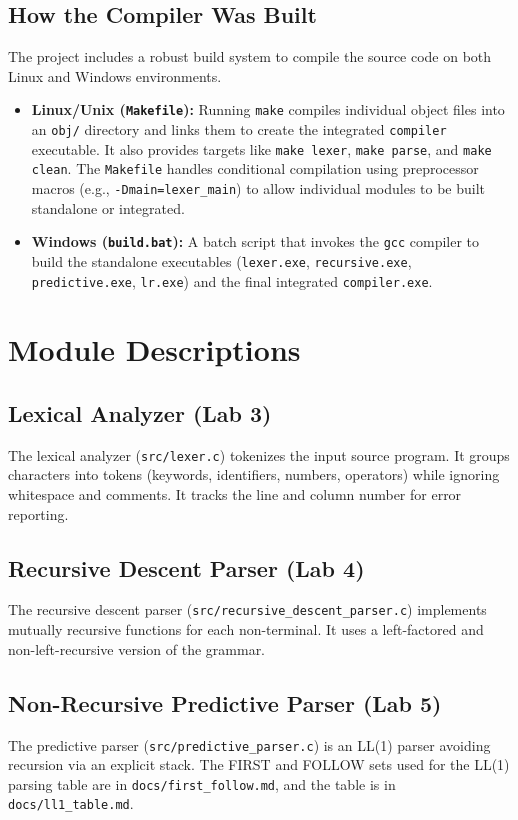 \documentclass[12pt,a4paper]{article}
\begin{document}
\subsection{How the Compiler Was Built}
The project includes a robust build system to compile the source code on both Linux and Windows environments.
\begin{itemize}
    \item \textbf{Linux/Unix (\texttt{Makefile}):} Running \texttt{make} compiles individual object files into an \texttt{obj/} directory and links them to create the integrated \texttt{compiler} executable. It also provides targets like \texttt{make lexer}, \texttt{make parse}, and \texttt{make clean}. The \texttt{Makefile} handles conditional compilation using preprocessor macros (e.g., \texttt{-Dmain=lexer\_main}) to allow individual modules to be built standalone or integrated.
    \item \textbf{Windows (\texttt{build.bat}):} A batch script that invokes the \texttt{gcc} compiler to build the standalone executables (\texttt{lexer.exe}, \texttt{recursive.exe}, \texttt{predictive.exe}, \texttt{lr.exe}) and the final integrated \texttt{compiler.exe}.
\end{itemize}

\section{Module Descriptions}

\subsection{Lexical Analyzer (Lab 3)}
The lexical analyzer (\texttt{src/lexer.c}) tokenizes the input source program. It groups characters into tokens (keywords, identifiers, numbers, operators) while ignoring whitespace and comments. It tracks the line and column number for error reporting.

\subsection{Recursive Descent Parser (Lab 4)}
The recursive descent parser (\texttt{src/recursive\_descent\_parser.c}) implements mutually recursive functions for each non-terminal. It uses a left-factored and non-left-recursive version of the grammar.

\subsection{Non-Recursive Predictive Parser (Lab 5)}
The predictive parser (\texttt{src/predictive\_parser.c}) is an LL(1) parser avoiding recursion via an explicit stack. The FIRST and FOLLOW sets used for the LL(1) parsing table are in \texttt{docs/first\_follow.md}, and the table is in \texttt{docs/ll1\_table.md}.
\end{document}
